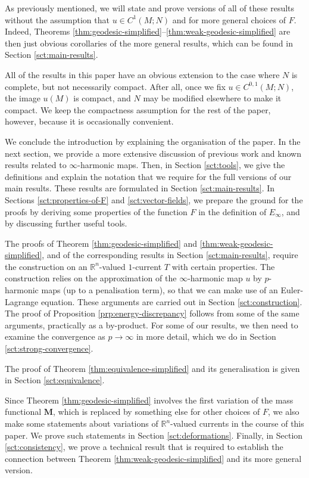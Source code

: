 \documentclass[10pt,a4paper]{amsart}
\newcommand{\R}{\mathbb{R}}
\newcommand{\M}{\mathbf{M}}
\begin{document}
As previously mentioned, we will state and prove versions of all of these
results without the assumption that $u \in C^1(M; N)$ and for more general choices of $F$. Indeed, Theorems \ref{thm:geodesic-simplified}--\ref{thm:weak-geodesic-simplified} are then just obvious corollaries of the more
general results, which can be found in Section \ref{sct:main-results}.

All of the results in this paper have an obvious extension to the case
where $N$ is complete, but not necessarily compact. After all, once we
fix $u \in C^{0, 1}(M; N)$, the image $u(M)$ is compact, and $N$ may be
modified elsewhere to make it compact. We keep the compactness assumption
for the rest of the paper, however, because it is occasionally convenient.

We conclude the introduction by explaining the organisation of the paper.
In the next section, we provide a more extensive discussion of previous
work and known results related to $\infty$-harmonic maps. Then, in Section
\ref{sct:tools}, we give the definitions and explain the notation that
we require for the full versions of our main results.
These results are formulated in Section \ref{sct:main-results}.
In Sections \ref{sct:properties-of-F} and \ref{sct:vector-fields}, we prepare
the ground for the proofs by deriving some properties of the function $F$
in the definition of $E_\infty$, and by discussing further useful tools.

The proofs of Theorem \ref{thm:geodesic-simplified} and \ref{thm:weak-geodesic-simplified},
and of the corresponding results in Section \ref{sct:main-results},
require the construction on an $\R^n$-valued $1$-current $T$ with certain
properties. The construction relies on the approximation of the
$\infty$-harmonic map $u$ by $p$-harmonic maps (up to a penalisation term),
so that we can make use of an Euler-Lagrange equation. These arguments are
carried out in Section \ref{sct:construction}. The proof of Proposition \ref{prp:energy-discrepancy}
follows from some of the same arguments, practically as a by-product. For some of our results, we
then need to examine the convergence as $p \to \infty$ in more detail,
which we do in Section \ref{sct:strong-convergence}.

The proof of Theorem \ref{thm:equivalence-simplified} and its generalisation
is given in Section \ref{sct:equivalence}.

Since Theorem \ref{thm:geodesic-simplified} involves the first variation
of the mass functional $\M$, which is replaced by something else for other
choices of $F$, we also make some statements about variations of
$\R^n$-valued currents in the course of this paper. We prove such statements
in Section \ref{sct:deformations}. Finally, in Section \ref{sct:consistency},
we prove a technical result that is required to establish the connection
between Theorem \ref{thm:weak-geodesic-simplified} and its more general
version.
\end{document}
